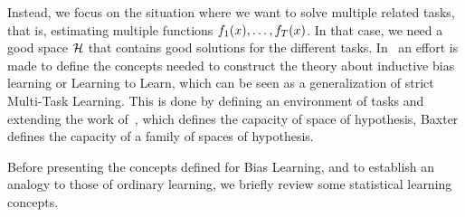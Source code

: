 Instead, we focus on the situation where we want to solve multiple related tasks, that is, estimating multiple functions $f_1(x), \ldots, f_T(x)$. In that case, we need a good space $\mathcal{H}$ that contains good solutions for the different tasks.
%
In~\cite{baxter2000model} an effort is made to define the concepts needed to construct the theory about inductive bias learning or Learning to Learn, which can be seen as a generalization of strict Multi-Task Learning. This is done by defining an environment of tasks and extending the work of~\cite{Vapnik00}, which defines the capacity of space of hypothesis, Baxter defines the capacity of a family of spaces of hypothesis.

Before presenting the concepts defined for Bias Learning, and to establish an analogy to those of ordinary learning, we briefly review some statistical learning concepts.
